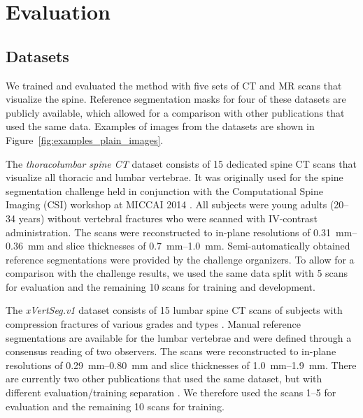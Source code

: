 \documentclass[authoryear,5p,final,times]{elsarticle}
\begin{document}
    \section{Evaluation}

    \subsection{Datasets}

    We trained and evaluated the method with five sets of CT and MR scans that visualize the spine. Reference segmentation masks for four of these datasets are publicly available, which allowed for a comparison with other publications that used the same data. Examples of images from the datasets are shown in Figure~\ref*{fig:examples_plain_images}.

    The \emph{thoracolumbar spine CT} dataset consists of 15 dedicated spine CT scans that visualize all thoracic and lumbar vertebrae. It was originally used for the spine segmentation challenge held in conjunction with the Computational Spine Imaging (CSI) workshop at MICCAI 2014 \citep{Yao2016}. All subjects were young adults (\numrange{20}{34} years) without vertebral fractures who were scanned with IV-contrast administration. The scans were reconstructed to in-plane resolutions of \SIrange{0.31}{0.36}{\milli\meter} and slice thicknesses of \SIrange{0.7}{1.0}{\milli\meter}. Semi-automatically obtained reference segmentations were provided by the challenge organizers. To allow for a comparison with the challenge results, we used the same data split with 5 scans for evaluation and the remaining 10 scans for training and development.

    The \emph{xVertSeg.v1} dataset consists of 15 lumbar spine CT scans of subjects with compression fractures of various grades and types \citep{Ibragimov2017}. Manual reference segmentations are available for the lumbar vertebrae and were defined through a consensus reading of two observers. The scans were reconstructed to in-plane resolutions of \SIrange{0.29}{0.80}{\milli\meter} and slice thicknesses of \SIrange{1.0}{1.9}{\milli\meter}. There are currently two other publications that used the same dataset, but with different evaluation/training separation \citep{Janssens2018,Sekuboyina2017}. We therefore used the scans \numrange{1}{5} for evaluation and the remaining 10 scans for training.
\end{document}

